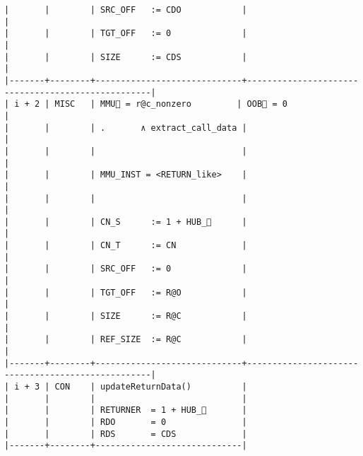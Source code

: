 \documentclass[varwidth=\maxdimen,margin=0.5cm,multi={verbatim}]{standalone}
\begin{document}
\begin{verbatim}
|       |        | SRC_OFF   := CDO            |                                                   |
|       |        | TGT_OFF   := 0              |                                                   |
|       |        | SIZE      := CDS            |                                                   |
|-------+--------+-----------------------------+---------------------------------------------------|
| i + 2 | MISC   | MMU🏴 = r@c_nonzero         | OOB🏴 = 0                                         |
|       |        | .       ∧ extract_call_data |                                                   |
|       |        |                             |                                                   |
|       |        | MMU_INST = <RETURN_like>    |                                                   |
|       |        |                             |                                                   |
|       |        | CN_S      := 1 + HUB_      |                                                   |
|       |        | CN_T      := CN             |                                                   |
|       |        | SRC_OFF   := 0              |                                                   |
|       |        | TGT_OFF   := R@O            |                                                   |
|       |        | SIZE      := R@C            |                                                   |
|       |        | REF_SIZE  := R@C            |                                                   |
|-------+--------+-----------------------------+---------------------------------------------------|
| i + 3 | CON    | updateReturnData()          |
|       |        |                             |
|       |        | RETURNER  = 1 + HUB_       |
|       |        | RDO       = 0               |
|       |        | RDS       = CDS             |
|-------+--------+-----------------------------|
\end{verbatim}
\end{document}
